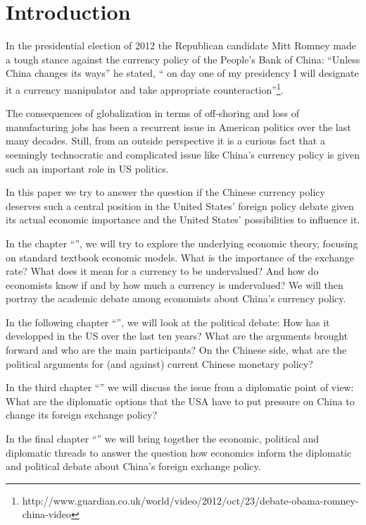 \section{Introduction}
\label{sec:introduction}

In the presidential election of 2012 the Republican candidate Mitt 
Romney made a tough stance against the currency policy of the People's 
Bank of China: ``Unless China changes its ways'' he stated, `` on day 
one of my presidency I will designate it a currency manipulator and take 
appropriate 
counteraction''\footnote{http://www.guardian.co.uk/world/video/2012/oct/23/debate-obama-romney-china-video}.

The consequences of globalization in terms of off-shoring and loss of 
manufacturing jobs has been a recurrent issue in American politics over 
the last many decades. Still, from an outside perspective it is a 
curious fact that a seemingly technocratic and complicated issue like 
China's currency policy is given such an important role in US politics.  

In this paper we try to answer the question if the Chinese currency 
policy deserves such a central position in the United States' foreign 
policy debate given its actual economic importance and the United 
States' possibilities to influence it.


In the chapter ``'', we will try to explore the 
underlying economic theory, focusing on standard textbook economic 
models.  What is the importance of the exchange rate?  What does it mean 
for a currency to be undervalued? And how do economists know if and by 
how much a currency is undervalued? We will then portray the academic 
debate among economists about China's currency policy. 

In the following chapter ``'', we will look at the 
political debate: How has it developped in the US over the last ten 
years?  What are the arguments brought forward and who are the main 
participants? On the Chinese side, what are the political arguments for 
(and against) current Chinese monetary policy?  

In the third chapter ``'' we will discuss the 
issue from a diplomatic point of view: What are the diplomatic options 
that the USA have to put pressure on China to change its foreign 
exchange policy? 

In the final chapter ``'' we will bring together 
the economic, political and diplomatic threads to answer the question 
how economics inform the diplomatic and political debate about China's 
foreign exchange policy.

